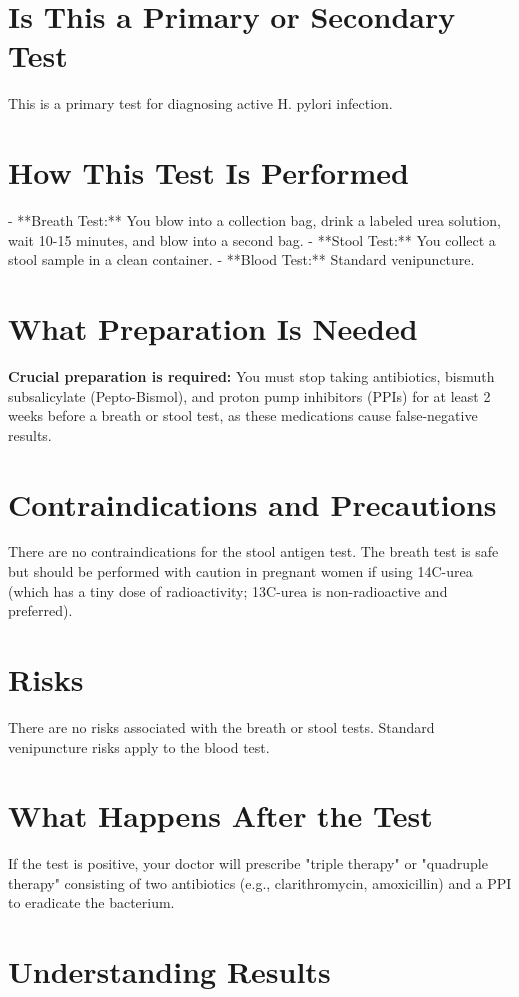 \section*{Is This a Primary or Secondary Test}
This is a primary test for diagnosing active H. pylori infection.

\section*{How This Test Is Performed}
- **Breath Test:** You blow into a collection bag, drink a labeled urea solution, wait 10-15 minutes, and blow into a second bag.
- **Stool Test:** You collect a stool sample in a clean container.
- **Blood Test:** Standard venipuncture.

\section*{What Preparation Is Needed}
\textbf{Crucial preparation is required:} You must stop taking antibiotics, bismuth subsalicylate (Pepto-Bismol), and proton pump inhibitors (PPIs) for at least 2 weeks before a breath or stool test, as these medications cause false-negative results.

\section*{Contraindications and Precautions}
There are no contraindications for the stool antigen test. The breath test is safe but should be performed with caution in pregnant women if using 14C-urea (which has a tiny dose of radioactivity; 13C-urea is non-radioactive and preferred).

\section*{Risks}
There are no risks associated with the breath or stool tests. Standard venipuncture risks apply to the blood test.

\section*{What Happens After the Test}
If the test is positive, your doctor will prescribe "triple therapy" or "quadruple therapy" consisting of two antibiotics (e.g., clarithromycin, amoxicillin) and a PPI to eradicate the bacterium.

\section*{Understanding Results}

